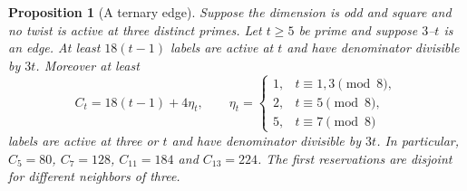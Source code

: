 \documentclass[11pt]{amsart}
\numberwithin{equation}{section}
\newtheorem{proposition}[theorem]{Proposition}
\theoremstyle{definition}
\theoremstyle{plain}
\begin{document}
\begin{proposition}[A ternary edge]\label{odd:edge35-reservation}
Suppose the dimension is odd and square and no twist is active at
three distinct primes. Let $t\ge5$ be prime and suppose $3$--$t$
is an edge. At least $18(t-1)$ labels are active at $t$ and have
denominator divisible by $3t$. Moreover at least
\[
 C_t=18(t-1)+4\eta_t,\qquad
 \eta_t=\begin{cases}
 1,&t\equiv1,3\pmod8,\\
 2,&t\equiv5\pmod8,\\
 5,&t\equiv7\pmod8
 \end{cases}
\]
labels are active at three or $t$ and have denominator divisible by $3t$. In particular,
$C_5=80$, $C_7=128$, $C_{11}=184$ and $C_{13}=224$.
The first reservations are disjoint for different neighbors of three.
\end{proposition}
\end{document}
